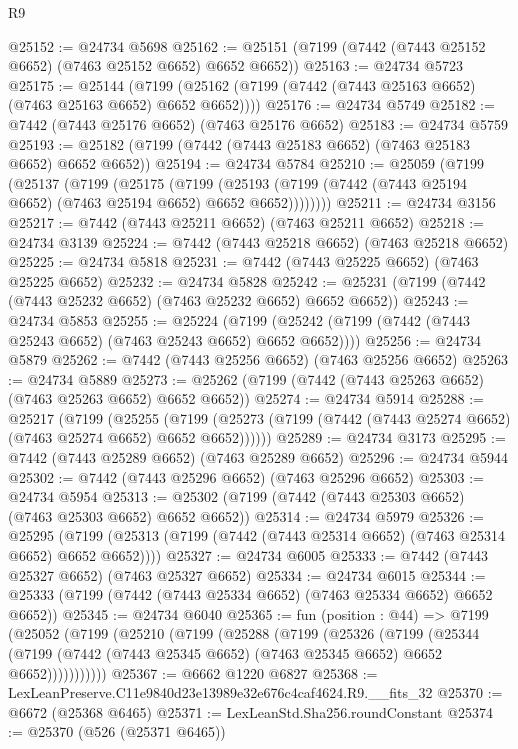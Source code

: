 \begin{lexlean}{R9}
\begin{coremodule}
@25152 := @24734 @5698
@25162 := @25151 (@7199 (@7442 (@7443 @25152 @6652) (@7463 @25152 @6652) @6652 @6652))
@25163 := @24734 @5723
@25175 := @25144
    (@7199 (@25162 (@7199 (@7442 (@7443 @25163 @6652) (@7463 @25163 @6652) @6652 @6652))))
@25176 := @24734 @5749
@25182 := @7442 (@7443 @25176 @6652) (@7463 @25176 @6652)
@25183 := @24734 @5759
@25193 := @25182 (@7199 (@7442 (@7443 @25183 @6652) (@7463 @25183 @6652) @6652 @6652))
@25194 := @24734 @5784
@25210 := @25059
    (@7199
      (@25137
        (@7199
          (@25175
            (@7199
              (@25193 (@7199 (@7442 (@7443 @25194 @6652) (@7463 @25194 @6652) @6652 @6652))))))))
@25211 := @24734 @3156
@25217 := @7442 (@7443 @25211 @6652) (@7463 @25211 @6652)
@25218 := @24734 @3139
@25224 := @7442 (@7443 @25218 @6652) (@7463 @25218 @6652)
@25225 := @24734 @5818
@25231 := @7442 (@7443 @25225 @6652) (@7463 @25225 @6652)
@25232 := @24734 @5828
@25242 := @25231 (@7199 (@7442 (@7443 @25232 @6652) (@7463 @25232 @6652) @6652 @6652))
@25243 := @24734 @5853
@25255 := @25224
    (@7199 (@25242 (@7199 (@7442 (@7443 @25243 @6652) (@7463 @25243 @6652) @6652 @6652))))
@25256 := @24734 @5879
@25262 := @7442 (@7443 @25256 @6652) (@7463 @25256 @6652)
@25263 := @24734 @5889
@25273 := @25262 (@7199 (@7442 (@7443 @25263 @6652) (@7463 @25263 @6652) @6652 @6652))
@25274 := @24734 @5914
@25288 := @25217
    (@7199
      (@25255
        (@7199 (@25273 (@7199 (@7442 (@7443 @25274 @6652) (@7463 @25274 @6652) @6652 @6652))))))
@25289 := @24734 @3173
@25295 := @7442 (@7443 @25289 @6652) (@7463 @25289 @6652)
@25296 := @24734 @5944
@25302 := @7442 (@7443 @25296 @6652) (@7463 @25296 @6652)
@25303 := @24734 @5954
@25313 := @25302 (@7199 (@7442 (@7443 @25303 @6652) (@7463 @25303 @6652) @6652 @6652))
@25314 := @24734 @5979
@25326 := @25295
    (@7199 (@25313 (@7199 (@7442 (@7443 @25314 @6652) (@7463 @25314 @6652) @6652 @6652))))
@25327 := @24734 @6005
@25333 := @7442 (@7443 @25327 @6652) (@7463 @25327 @6652)
@25334 := @24734 @6015
@25344 := @25333 (@7199 (@7442 (@7443 @25334 @6652) (@7463 @25334 @6652) @6652 @6652))
@25345 := @24734 @6040
@25365 := fun (position : @44) =>
  @7199
    (@25052
      (@7199
        (@25210
          (@7199
            (@25288
              (@7199
                (@25326
                  (@7199
                    (@25344
                      (@7199 (@7442 (@7443 @25345 @6652) (@7463 @25345 @6652) @6652 @6652)))))))))))
@25367 := @6662 @1220 @6827
@25368 := LexLeanPreserve.C11e9840d23e13989e32e676c4caf4624.R9.__fits_32
@25370 := @6672 (@25368 @6465)
@25371 := LexLeanStd.Sha256.roundConstant
@25374 := @25370 (@526 (@25371 @6465))

\end{coremodule}
\end{lexlean}

